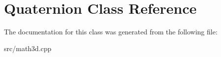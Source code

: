 \hypertarget{classQuaternion}{}\section{Quaternion Class Reference}
\label{classQuaternion}


The documentation for this class was generated from the following file\+:\begin{DoxyCompactItemize}
\item 
src/math3d.\+cpp\end{DoxyCompactItemize}
